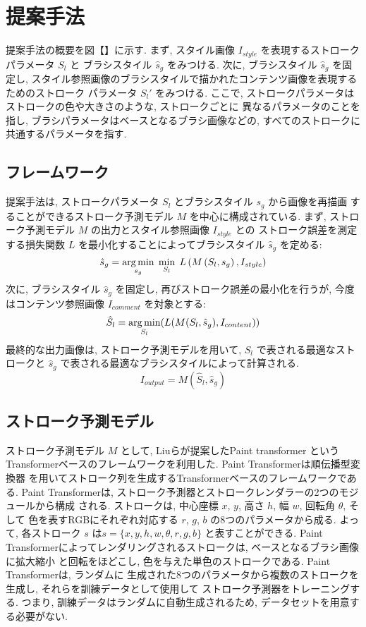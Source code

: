 \documentclass[MIRU,submit,uplatex]{miru2023j}
\begin{document}
\section{提案手法}
提案手法の概要を図【】に示す. 
まず, スタイル画像 $I_{style}$ を表現するストロークパラメータ $S_l$ と
ブラシスタイル $\hat{s}_g$ をみつける. 次に, ブラシスタイル $\hat{s}_g$ を固定し, 
スタイル参照画像のブラシスタイルで描かれたコンテンツ画像を表現するためのストローク
パラメータ $S_l'$ をみつける. 
ここで, ストロークパラメータはストロークの色や大きさのような, ストロークごとに
異なるパラメータのことを指し, ブラシパラメータはベースとなるブラシ画像などの, 
すべてのストロークに共通するパラメータを指す. 

\subsection{フレームワーク}
提案手法は, ストロークパラメータ $S_l$ とブラシスタイル $s_g$ から画像を再描画
することができるストローク予測モデル $M$ を中心に構成されている. 
まず, ストローク予測モデル $M$ の出力とスタイル参照画像 $I_{style}$ との
ストローク誤差を測定する損失関数 $L$ を最小化することによってブラシスタイル
$\hat{s}_g$ を定める: 
\begin{equation}
    \hat{s}_g = \operatorname*{arg\,min}_{s_g} \;
        \min_{S_l} \;
           L\left( M\left(S_l, s_g\right), I_{style}\right)
    \label{eq_first}
\end{equation}
次に, ブラシスタイル $\hat{s}_g$ を固定し, 再びストローク誤差の最小化を行うが,
今度はコンテンツ参照画像 $I_{comment}$ を対象とする: 
\begin{equation}
    \hat{S}_l = \operatorname*{arg\,min}_{S_l} (L(M(S_l, \hat{s}_g), I_{content}))
    \label{eq_second}
\end{equation}
最終的な出力画像は, ストローク予測モデルを用いて, $S_l$ で表される最適なストロークと
$\hat{s}_g$ で表される最適なブラシスタイルによって計算される.
\begin{equation}
    I_{output} = M( \hat{S}_l, \hat{s}_g )
\end{equation}
 
\subsection{ストローク予測モデル}
ストローク予測モデル $M$ として, Liuら\cite{PaintTransformer}が提案したPaint transformer
というTransformerベースのフレームワークを利用した. Paint Transformerは順伝播型変換器
を用いてストローク列を生成するTransformerベースのフレームワークである.
Paint Transformerは, ストローク予測器とストロークレンダラーの2つのモジュールから構成
される. ストロークは, 中心座標 $x$, $y$, 高さ $h$, 幅 $w$, 回転角 $\theta$, そして
色を表すRGBにそれぞれ対応する $r$, $g$, $b$ の8つのパラメータから成る. 
よって, 各ストローク $s$ は$s = \{ x, y, h, w, \theta, r, g, b \}$ と表すことができる.
Paint Transformerによってレンダリングされるストロークは, ベースとなるブラシ画像に拡大縮小
と回転をほどこし, 色を与えた単色のストロークである. Paint Transformerは, ランダムに
生成された8つのパラメータから複数のストロークを生成し, それらを訓練データとして使用して
ストローク予測器をトレーニングする. つまり, 訓練データはランダムに自動生成されるため,
データセットを用意する必要がない.
\end{document}
